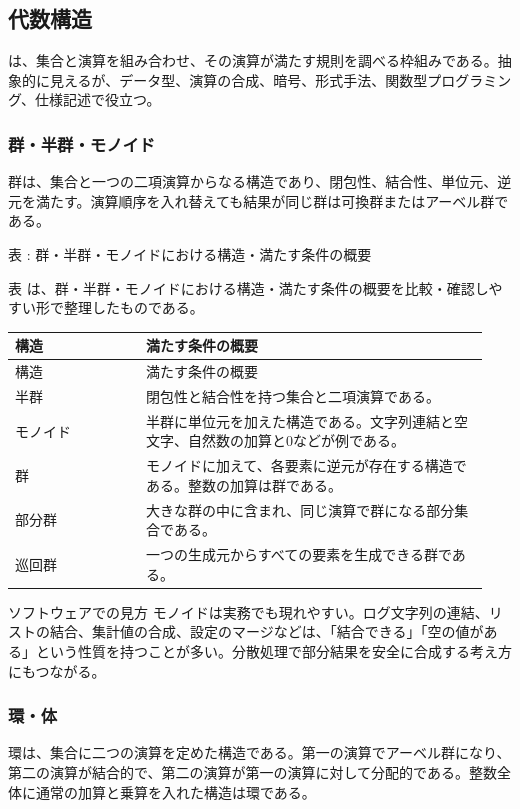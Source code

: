 \subsection{代数構造}
は、集合と演算を組み合わせ、その演算が満たす規則を調べる枠組みである。抽象的に見えるが、データ型、演算の合成、暗号、形式手法、関数型プログラミング、仕様記述で役立つ。

\subsubsection{群・半群・モノイド}
群は、集合と一つの二項演算からなる構造であり、閉包性、結合性、単位元、逆元を満たす。演算順序を入れ替えても結果が同じ群は可換群またはアーベル群である。

\par\smallskip\noindent{}\label{tab:ch17-20}表 \thetable: 群・半群・モノイドにおける構造・満たす条件の概要\par\smallskip
表 \thetable は、群・半群・モノイドにおける構造・満たす条件の概要を比較・確認しやすい形で整理したものである。\par\smallskip
\begin{longtable}{>{\raggedright\arraybackslash}p{0.26\linewidth} >{\raggedright\arraybackslash}p{0.68\linewidth}}
\toprule
構造 & 満たす条件の概要 \\
\midrule
\endfirsthead
\toprule
構造 & 満たす条件の概要 \\
\midrule
\endhead
半群 & 閉包性と結合性を持つ集合と二項演算である。 \\
モノイド & 半群に単位元を加えた構造である。文字列連結と空文字、自然数の加算と0などが例である。 \\
群 & モノイドに加えて、各要素に逆元が存在する構造である。整数の加算は群である。 \\
部分群 & 大きな群の中に含まれ、同じ演算で群になる部分集合である。 \\
巡回群 & 一つの生成元からすべての要素を生成できる群である。 \\
\bottomrule
\end{longtable}
\begin{notebox}{ソフトウェアでの見方}
モノイドは実務でも現れやすい。ログ文字列の連結、リストの結合、集計値の合成、設定のマージなどは、「結合できる」「空の値がある」という性質を持つことが多い。分散処理で部分結果を安全に合成する考え方にもつながる。
\end{notebox}
\subsubsection{環・体}
環は、集合に二つの演算を定めた構造である。第一の演算でアーベル群になり、第二の演算が結合的で、第二の演算が第一の演算に対して分配的である。整数全体に通常の加算と乗算を入れた構造は環である。

